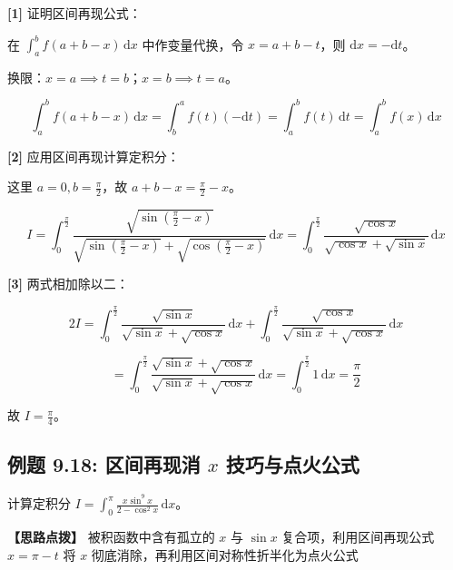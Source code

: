 \documentclass[11pt,a4paper,UTF8]{ctexart}
\begin{document}
\begin{solbox}[分步推导与答题规范]
\textbf{[1]} 证明区间再现公式：

在 $\int_a^b f(a+b-x)\,\mathrm{d}x$ 中作变量代换，令 $x = a+b-t$，则 $\mathrm{d}x = -\mathrm{d}t$。

换限：$x=a \implies t=b$；$x=b \implies t=a$。


\begin{equation*}
\int_a^b f(a+b-x)\,\mathrm{d}x = \int_b^a f(t)(-\mathrm{d}t) = \int_a^b f(t)\,\mathrm{d}t = \int_a^b f(x)\,\mathrm{d}x
\end{equation*}


\textbf{[2]} 应用区间再现计算定积分：

这里 $a=0, b=\frac{\pi}{2}$，故 $a+b-x = \frac{\pi}{2} - x$。


\begin{equation*}
I = \int_0^{\frac{\pi}{2}} \frac{\sqrt{\sin\left(\frac{\pi}{2}-x\right)}}{\sqrt{\sin\left(\frac{\pi}{2}-x\right)} + \sqrt{\cos\left(\frac{\pi}{2}-x\right)}}\,\mathrm{d}x = \int_0^{\frac{\pi}{2}} \frac{\sqrt{\cos x}}{\sqrt{\cos x} + \sqrt{\sin x}}\,\mathrm{d}x
\end{equation*}


\textbf{[3]} 两式相加除以二：


\begin{equation*}
2I = \int_0^{\frac{\pi}{2}} \frac{\sqrt{\sin x}}{\sqrt{\sin x} + \sqrt{\cos x}}\,\mathrm{d}x + \int_0^{\frac{\pi}{2}} \frac{\sqrt{\cos x}}{\sqrt{\sin x} + \sqrt{\cos x}}\,\mathrm{d}x
\end{equation*}



\begin{equation*}
= \int_0^{\frac{\pi}{2}} \frac{\sqrt{\sin x} + \sqrt{\cos x}}{\sqrt{\sin x} + \sqrt{\cos x}}\,\mathrm{d}x = \int_0^{\frac{\pi}{2}} 1\,\mathrm{d}x = \frac{\pi}{2}
\end{equation*}


故 $I = \frac{\pi}{4}$。
\end{solbox}


\subsection{例题 9.18: 区间再现消 $x$ 技巧与点火公式}

计算定积分 $I = \int_0^\pi \frac{x\sin^9 x}{2-\cos^2 x}\,\mathrm{d}x$。

\textbf{\color{DeepPurple}【思路点拨】} 被积函数中含有孤立的 $x$ 与 $\sin x$ 复合项，利用区间再现公式 $x = \pi - t$ 将 $x$ 彻底消除，再利用区间对称性折半化为点火公式
\end{document}
